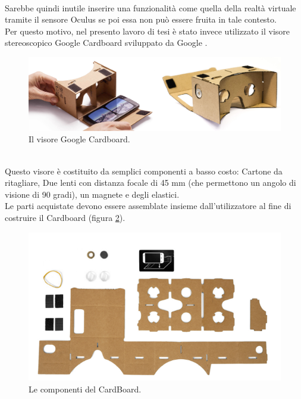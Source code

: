 \\
Sarebbe quindi inutile inserire una funzionalità come quella della realtà virtuale tramite il sensore Oculus se poi  essa non può essere fruita in tale contesto.
\\
Per questo motivo, nel presento lavoro di tesi è stato invece utilizzato il visore stereoscopico Google Cardboard sviluppato da Google \cite{cardboard}.
\\
\begin{figure}[htb]
 \centering
 \includegraphics[width=1\linewidth]{images/chapter_navigazione_scena/cardboard.png}\hfill
 \caption[Il visore Google Cardboard.]{Il visore Google Cardboard.}
 \label{fig:navigazione_scena_navigator_oculus}
\end{figure}
\\
Questo visore è costituito da semplici componenti a basso costo: Cartone da ritagliare, Due lenti con distanza focale di 45 mm (che permettono un angolo di visione di 90 gradi), un magnete e degli elastici.
\\
Le parti acquistate devono essere assemblate insieme dall’utilizzatore al fine di costruire il Cardboard (figura \ref{fig:navigazione_scena_navigator_cardboard_pezzi}).
\begin{figure}[htb]
 \centering
 \includegraphics[width=0.8\linewidth]{images/chapter_navigazione_scena/cardboard_pezzi.png}\hfill
 \caption[Le componenti del CardBoard.]{Le componenti del CardBoard.}
 \label{fig:navigazione_scena_navigator_cardboard_pezzi}
\end{figure}
